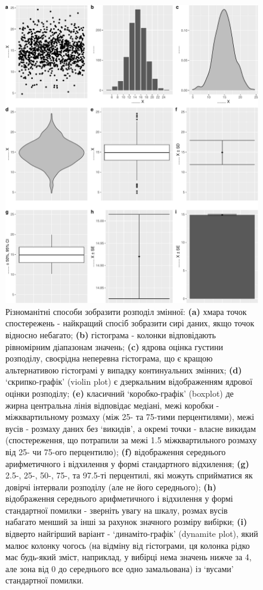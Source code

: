 \documentclass[
  11pt,
]{book}
\begin{document}
\begin{figure}
\centering
\includegraphics{bookdown-demo_files/figure-latex/fig-3-10-1.pdf}
\caption{\label{fig:fig-3-10}Різноманітні способи зобразити розподіл змінної: \textbf{(a)} хмара точок спостережень - найкращий спосіб зобразити сирі даних, якщо точок відносно небагато; \textbf{(b)} гістограма - колонки відповідають рівномірним діапазонам значень; \textbf{(c)} ядрова оцінка густини розподілу, своєрідна неперевна гістограма, що є кращою альтернативою гістограмі у випадку континуальних змінних; \textbf{(d)} `скрипко-графік' (violin plot) є дзеркальним відображенням ядрової оцінки розподілу; \textbf{(e)} класичний `коробко-графік' (boxplot) де жирна центральна лінія відповідає медіані, межі коробки - міжквартильному розмаху (між 25- та 75-тими перцентилями), межі вусів - розмаху даних без `викидів', а окремі точки - власне викидам (спостереження, що потрапили за межі 1.5 міжквартильного розмаху від 25- чи 75-ого перцентилю); \textbf{(f)} відображення середнього арифметичного і відхилення у формі стандартного відхилення; \textbf{(g)} 2.5-, 25-, 50-, 75-, та 97.5-ті перцентилі, які можуть сприйматися як довірчі інтервали розподілу (але не його середнього); \textbf{(h)} відображення середнього арифметичного і відхилення у формі стандартної помилки - зверніть увагу на шкалу, розмах вусів набагато менший за інші за рахунок значного розміру вибірки; \textbf{(i)} відверто найгірший варіант - `динаміто-графік' (dynamite plot), який малює колонку чогось (на відміну від гістограми, ця колонка рідко має будь-який зміст, наприклад, у вибірці нема значень нижче за 4, але зона від 0 до середнього все одно замальована) із `вусами' стандартної помилки.}
\end{figure}
\end{document}

